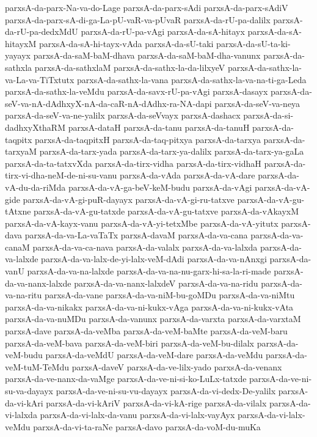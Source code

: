 {parxsA-da-parx-Na-va-do-Lage
parxsA-da-parx-sAdi
parxsA-da-parx-sAdiV
parxsA-da-parx-sA-di-ga-La-pU-vaR-va-pUvaR
parxsA-da-rU-pa-dalilx
parxsA-da-rU-pa-dedxMdU
parxsA-da-rU-pa-vAgi
parxsA-da-sA-hitayx
parxsA-da-sA-hitayxM
parxsA-da-sA-hi-tayx-vAda
parxsA-da-sU-taki
parxsA-da-sU-ta-ki-yayayx
parxsA-da-saM-baM-dhava
parxsA-da-saM-baM-dha-vanunx
parxsA-da-sathxla
parxsA-da-sathxlaM
parxsA-da-sathx-la-da-lilxyeV
parxsA-da-sathx-la-va-La-va-TiTxtutx
parxsA-da-sathx-la-vana
parxsA-da-sathx-la-va-na-ti-ga-Leda
parxsA-da-sathx-la-veMdu
parxsA-da-savx-rU-pa-vAgi
parxsA-dasayx
parxsA-da-seV-va-nA-dAdhxyX-nA-da-caR-nA-dAdhx-ra-NA-dapi
parxsA-da-seV-va-neya
parxsA-da-seV-va-ne-yalilx
parxsA-da-seVvayx
parxsA-dashacx
parxsA-da-si-dadhxyXthaRM
parxsA-dataH
parxsA-da-tanu
parxsA-da-tanuH
parxsA-da-taqpitx
parxsA-da-taqpitxH
parxsA-da-taq-pitxya
parxsA-da-tarxya
parxsA-da-tarxyaM
parxsA-da-tarx-yada
parxsA-da-tarx-ya-dalilx
parxsA-da-tarx-ya-gaLa
parxsA-da-ta-tatxvXda
parxsA-da-tirx-vidha
parxsA-da-tirx-vidhaH
parxsA-da-tirx-vi-dha-neM-de-ni-su-vanu
parxsA-da-vAda
parxsA-da-vA-dare
parxsA-da-vA-du-da-riMda
parxsA-da-vA-ga-beV-keM-budu
parxsA-da-vAgi
parxsA-da-vA-gide
parxsA-da-vA-gi-puR-dayayx
parxsA-da-vA-gi-ru-tatxve
parxsA-da-vA-gu-tAtxne
parxsA-da-vA-gu-tatxde
parxsA-da-vA-gu-tatxve
parxsA-da-vAkayxM
parxsA-da-vA-kayx-vanu
parxsA-da-vA-yi-tetxMbe
parxsA-da-vA-yitutx
parxsA-dava
parxsA-da-va-La-vaTaTx
parxsA-davaM
parxsA-da-va-cana
parxsA-da-va-canaM
parxsA-da-va-ca-nava
parxsA-da-valalx
parxsA-da-va-lalxda
parxsA-da-va-lalxde
parxsA-da-va-lalx-de-yi-lalx-veM-dAdi
parxsA-da-va-nAnxgi
parxsA-da-vanU
parxsA-da-va-na-lalxde
parxsA-da-va-na-nu-garx-hi-sa-la-ri-made
parxsA-da-va-nanx-lalxde
parxsA-da-va-nanx-lalxdeV
parxsA-da-va-na-ridu
parxsA-da-va-na-ritu
parxsA-da-vane
parxsA-da-va-niM-bu-goMDu
parxsA-da-va-niMtu
parxsA-da-va-nikakx
parxsA-da-va-ni-kukx-vAga
parxsA-da-va-ni-kukx-vAta
parxsA-da-va-nuMDu
parxsA-da-vanunx
parxsA-da-varxta
parxsA-da-varxtaM
parxsA-dave
parxsA-da-veMba
parxsA-da-veM-baMte
parxsA-da-veM-baru
parxsA-da-veM-bava
parxsA-da-veM-biri
parxsA-da-veM-bu-dilalx
parxsA-da-veM-budu
parxsA-da-veMdU
parxsA-da-veM-dare
parxsA-da-veMdu
parxsA-da-veM-tuM-TeMdu
parxsA-daveV
parxsA-da-ve-lilx-yado
parxsA-da-venanx
parxsA-da-ve-nanx-da-vaMge
parxsA-da-ve-ni-si-ko-LuLx-tatxde
parxsA-da-ve-ni-su-va-dayayx
parxsA-da-ve-ni-su-vu-dayayx
parxsA-da-vi-dedx-De-yalilx
parxsA-da-vi-kAri
parxsA-da-vi-kAriV
parxsA-da-vi-kA-rige
parxsA-da-vilalx
parxsA-da-vi-lalxda
parxsA-da-vi-lalx-da-vanu
parxsA-da-vi-lalx-vayAyx
parxsA-da-vi-lalx-veMdu
parxsA-da-vi-ta-raNe
parxsA-davo
parxsA-da-voM-du-muKa
}
